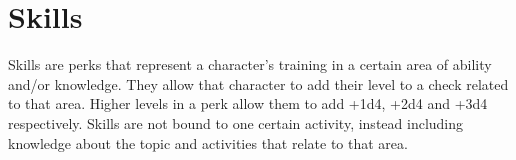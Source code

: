 \chapter{Skills}
Skills are perks that represent a character's training in a certain area of ability and/or knowledge. They allow that character to add their level to a check related to that area. Higher levels in a perk allow them to add +1d4, +2d4 and +3d4 respectively. Skills are not bound to one certain activity, instead including knowledge about the topic and activities that relate to that area.

	
	
	
	
	
	
	
	
	
	
	
	
	
	
	
	
	
	
	
	
	
	
	
	
	
	
	
	
	
	
	
	
	
	
	